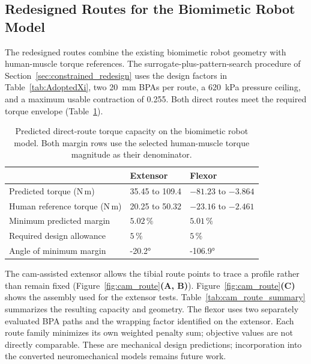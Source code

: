 \subsection{Redesigned Routes for the Biomimetic Robot Model}\label{sec:route_redesign_results}

The redesigned routes combine the existing biomimetic robot geometry with human-muscle torque references. The surrogate-plus-pattern-search procedure of Section~\ref{sec:constrained_redesign} uses the design factors in Table~\ref{tab:AdoptedXi}, two \qty{20}{\mm} BPAs per route, a \qty{620}{\kPa} pressure ceiling, and a maximum usable contraction of 0.255. Both direct routes meet the required torque envelope (Table~\ref{tab:redesigned_route_capacity}).

\begin{table}[htbp]
\centering
\caption{Predicted direct-route torque capacity on the biomimetic robot model. Both margin rows use the selected human-muscle torque magnitude as their denominator.}
\label{tab:redesigned_route_capacity}
\small
\begin{tabularx}{\textwidth}{@{}lXX@{}}
\toprule
 & \textbf{Extensor} & \textbf{Flexor}\\
\midrule
Predicted torque (N\,m) & 35.45 to 109.4 & $-81.23$ to $-3.864$\\
Human reference torque (N\,m) & 20.25 to 50.32 & $-23.16$ to $-2.461$\\
Minimum predicted margin & $5.02\,\%$ & $5.01\,\%$\\
Required design allowance & $5\,\%$ & $5\,\%$\\
Angle of minimum margin & \ang{-20.2} & \ang{-106.9}\\
\bottomrule
\end{tabularx}
\end{table}

The cam-assisted extensor allows the tibial route points to trace a profile rather than remain fixed (Figure~\ref{fig:cam_route}\textbf{(A, B)}). Figure~\ref{fig:cam_route}\textbf{(C)} shows the assembly used for the extensor tests. Table~\ref{tab:cam_route_summary} summarizes the resulting capacity and geometry. The flexor uses two separately evaluated BPA paths and the wrapping factor identified on the extensor. Each route family minimizes its own weighted penalty sum; objective values are not directly comparable. These are mechanical design predictions; incorporation into the converted neuromechanical models remains future work.

